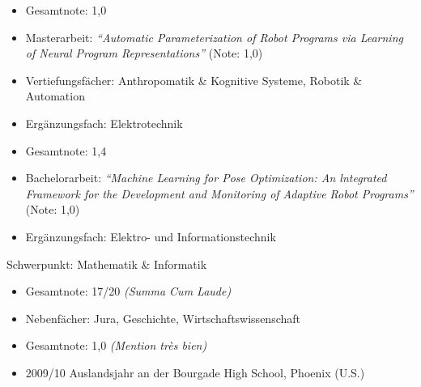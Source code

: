 \begin{itemize}
  \item Gesamtnote: 1,0
  \item Masterarbeit: \textit{"`Automatic Parameterization of Robot Programs via Learning of Neural Program Representations"'} (Note: 1,0)
  \item Vertiefungsfächer: Anthropomatik \& Kognitive Systeme, Robotik \& Automation
  \item Ergänzungsfach: Elektrotechnik
\end{itemize}

\divider

\begin{itemize}
  \item Gesamtnote: 1,4
  \item Bachelorarbeit: \textit{"`Machine Learning for Pose Optimization: An lntegrated Framework for the Development and Monitoring of Adaptive Robot Programs"'} (Note: 1,0)
  \item Ergänzungsfach: Elektro- und Informationstechnik
\end{itemize}

\divider


Schwerpunkt: Mathematik \& Informatik

\divider


\begin{itemize}
  \item Gesamtnote: 17/20 \textit{(Summa Cum Laude)}
  \item Nebenfächer: Jura, Geschichte, Wirtschaftswissenschaft
\end{itemize}

\divider

\begin{itemize}
  \item Gesamtnote: 1,0 \textit{(Mention très bien)}
  \item 2009/10 Auslandsjahr an der Bourgade High School, Phoenix (U.S.) 
\end{itemize}
\medskip